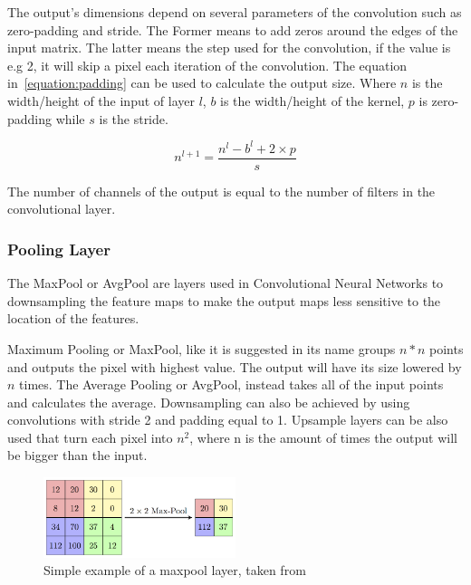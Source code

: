 The output's dimensions depend on several parameters of the convolution such as
zero-padding and stride. The Former means to add zeros around the edges of the
input matrix. The latter means the step used for the convolution, if the value
is e.g 2, it will skip a pixel each iteration of the convolution.  The equation
in~\ref{equation:padding} can be used to calculate the output size. Where $n$ is
the width/height of the input of layer $l$, $ b$ is the width/height of the
kernel, $p$ is zero-padding while $s$ is the stride.

\begin{equation} \label{equation:padding}
     n^{l+1} = \frac{n^{l}- b^{l}+2 \times p}{s}
\end{equation}

The number of channels of the output is equal to the number of filters in the
convolutional layer.



\subsubsection{Pooling Layer}

The MaxPool or AvgPool are layers used in Convolutional Neural Networks to
downsampling the feature maps to make the output maps less sensitive to the
location of the features.

Maximum Pooling or MaxPool, like it is suggested in its name groups $ n * n $
points and outputs the pixel with highest value.  The output will have its size
lowered by $ n $ times.  The Average Pooling or AvgPool, instead takes all of
the input points and calculates the average. Downsampling can also be achieved
by using convolutions with stride 2 and padding equal to 1.  Upsample layers can
be also used that turn each pixel into $ n^{2} $, where n is the amount of times
the output will be bigger than the input.

\begin{figure}[!htbp]
    \centering
    \includegraphics[width=0.5\textwidth]{Figures/maxpool.png}
    \caption{Simple example of a maxpool layer, taken from~\cite{maxpoolimg}}
    \label{figure:maxpool}
\end{figure} 
 

